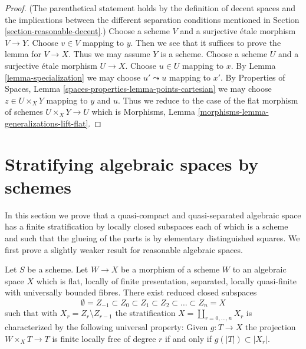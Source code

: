 \begin{proof}
(The parenthetical statement holds by the definition of decent spaces
and the implications between the different separation conditions
mentioned in Section \ref{section-reasonable-decent}.)
Choose a scheme $V$ and a surjective \'etale morphism $V \to Y$.
Choose $v \in V$ mapping to $y$. Then we see that it suffices to
prove the lemma for $V \to X$. Thus we may assume $Y$ is a scheme.
Choose a scheme $U$ and a surjective \'etale morphism $U \to X$.
Choose $u \in U$ mapping to $x$. By Lemma \ref{lemma-specialization}
we may choose $u' \leadsto u$ mapping to $x'$. By
Properties of Spaces, Lemma \ref{spaces-properties-lemma-points-cartesian}
we may choose $z \in U \times_X Y$ mapping to $y$ and $u$.
Thus we reduce to the case of the flat morphism of
schemes $U \times_X Y \to U$ which is
Morphisms, Lemma \ref{morphisms-lemma-generalizations-lift-flat}.
\end{proof}






\section{Stratifying algebraic spaces by schemes}
\label{section-stratifications}

\noindent
In this section we prove that a quasi-compact and quasi-separated
algebraic space has a finite stratification by locally closed subspaces
each of which is a scheme and such that the glueing of the parts is by
elementary distinguished squares. We first prove a slightly weaker
result for reasonable algebraic spaces.

\begin{lemma}
\label{lemma-quasi-compact-reasonable-stratification}
Let $S$ be a scheme. Let $W \to X$ be a morphism of a scheme $W$
to an algebraic space $X$ which is flat, locally of finite presentation,
separated, locally quasi-finite with universally bounded fibres. There exist
reduced closed subspaces
$$
\emptyset = Z_{-1} \subset Z_0 \subset Z_1 \subset Z_2 \subset
\ldots \subset Z_n = X
$$
such that with $X_r = Z_r \setminus Z_{r - 1}$ the stratification
$X = \coprod_{r = 0, \ldots, n} X_r$ is characterized by the following
universal property: Given $g : T \to X$ the projection
$W \times_X T \to T$ is finite locally free of degree $r$ if and only if
$g(|T|) \subset |X_r|$.
\end{lemma}


